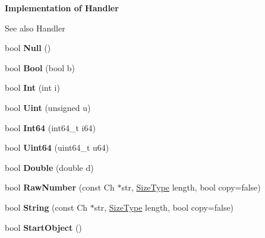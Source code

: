 \begin{Indent}\textbf{ Implementation of Handler}\par
{\em \begin{DoxySeeAlso}{See also}
Handler 
\end{DoxySeeAlso}
}\begin{DoxyCompactItemize}
\item 
\mbox{\label{a02228_aa144f2d0f0c3c69248cdbe957349528c}} 
bool {\bfseries Null} ()
\item 
\mbox{\label{a02228_a6e765ee7ada5ed40f317c78a98f6f90b}} 
bool {\bfseries Bool} (bool b)
\item 
\mbox{\label{a02228_aa1815263e61cb7af3b6dfba480a0f481}} 
bool {\bfseries Int} (int i)
\item 
\mbox{\label{a02228_a8c82302877a5588eae77eb7d042c49ef}} 
bool {\bfseries Uint} (unsigned u)
\item 
\mbox{\label{a02228_ad42b797429f4ee19efdce610f5aff976}} 
bool {\bfseries Int64} (int64\+\_\+t i64)
\item 
\mbox{\label{a02228_aba75ac1f13c2629b2a55ffbf3d8a116c}} 
bool {\bfseries Uint64} (uint64\+\_\+t u64)
\item 
\mbox{\label{a02228_ad9d592e86b985da666665926e87db415}} 
bool {\bfseries Double} (double d)
\item 
\mbox{\label{a02228_a3941bc21d6a261ca8a86eff330db30ef}} 
bool {\bfseries Raw\+Number} (const Ch $\ast$str, \hyperlink{a00560_a5ed6e6e67250fadbd041127e6386dcb5}{Size\+Type} length, bool copy=false)
\item 
\mbox{\label{a02228_ae544ccfe35dd7e80ed694873062409f6}} 
bool {\bfseries String} (const Ch $\ast$str, \hyperlink{a00560_a5ed6e6e67250fadbd041127e6386dcb5}{Size\+Type} length, bool copy=false)
\item 
\mbox{\label{a02228_a27bdda225dc152b8974e44c1df7525b7}} 
bool {\bfseries Start\+Object} ()
\item 
\mbox{\label{a02228_a20ecbe1d31a871e4da4a3899b40ad3cd}} 

\end{DoxyCompactItemize}
\end{Indent}
